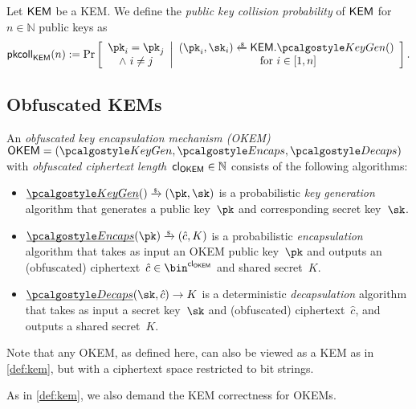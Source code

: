 \begin{definition}
    \label{def:pk-collisions}
    Let $\mathsf{KEM}$ be a KEM.
    We define the \emph{public key collision probability} of $\mathsf{KEM}$ for $n \in \mathbb{N}$ public keys as
    \[
        \pkcoll{\KEM}(n) := \Pr\left[
            \begin{array}{c}
                \pk_i = \pk_j \\
                \land~ i \neq j
            \end{array}
            \middle|
            \begin{array}{c}
                (\pk_i,\sk_i) \getsr \KEM.\kgen() \\
                \text{ for } i \in [1,n]
            \end{array}
            \right].
    \]
\end{definition}

\subsection{Obfuscated KEMs}

\begin{definition}
    \label{def:okem}
    An \emph{obfuscated key encapsulation mechanism (OKEM)} $\OKEM = (\kgen, \encaps, \decaps)$ with \emph{obfuscated ciphertext length}~${\mathsf{cl}_{\mathsf{OKEM}}} \in \mathbb{N}$ consists of the following algorithms:
    \begin{itemize}
        \item $\ul{\kgen}() \tor (\pk,\sk)$ is a probabilistic \emph{key generation} algorithm that generates a public key~$\pk$ and corresponding secret key~$\sk$.

        \item $\ul{\encaps}(\pk) \tor (\hat c, K)$ is a probabilistic \emph{encapsulation} algorithm that takes as input an OKEM public key~$\pk$ and outputs an (obfuscated) ciphertext~$\hat c \in \bin^\obfctxtlen$ and shared secret~$K$.

        \item $\ul{\decaps}(\sk,\hat c) \to K$ is a deterministic \emph{decapsulation} algorithm that takes as input a secret key~$\sk$ and (obfuscated) ciphertext~$\hat c$, and outputs a shared secret~$K$.
    \end{itemize}
    Note that any OKEM, as defined here, can also be viewed as a KEM as in \cref{def:kem}, but with a ciphertext space restricted to bit strings.

    As in \cref{def:kem}, we also demand the KEM correctness for OKEMs.
\end{definition}

